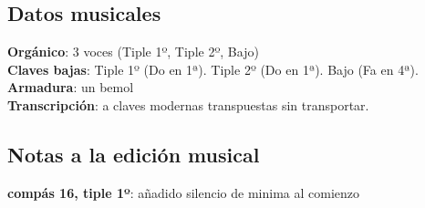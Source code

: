 \subsection*{Datos musicales}
\noindent \textbf{Orgánico}: 3 voces (Tiple 1º, Tiple 2º, Bajo)\\
\textbf{Claves bajas}: Tiple 1º (Do en 1ª). Tiple 2º (Do en 1ª). Bajo (Fa en 4ª).\\
\textbf{Armadura}: un bemol\\
\textbf{Transcripción}: a claves modernas transpuestas sin transportar.

\subsection*{Notas a la edición musical}

\noindent \textbf{compás 16, tiple 1º}: añadido silencio de minima al comienzo
